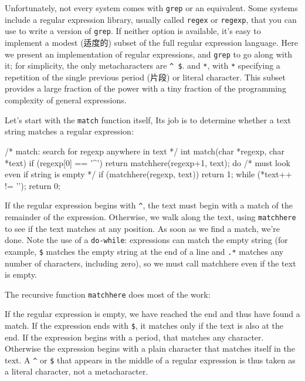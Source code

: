 Unfortunately, not every system comes with \verb'grep' or an equivalent.
Some systems include a regular expression library, usually called
\verb'regex' or \verb'regexp', that you can use to write a version of
\verb'grep'. If neither option is available, it's easy to implement a
modest (适度的) subset of the full regular expression language. Here we
present an implementation of regular expressions, and \verb'grep' to go
along with it; for simplicity, the only metacharacters are \verb'^ $'. and
\verb'*', with \verb'*' specifying a repetition of the single previous
period (片段) or literal character. This subset provides a large fraction
of the power with a tiny fraction of the programming complexity of general
expressions.

Let's start with the \verb'match' function itself, Its job is to determine
whether a text string matches a regular expression:
\begin{wellcode}
    /* match: search for regexp anywhere in text */
    int match(char *regexp, char *text)
    {
        if (regexp[0] == '^')
            return matchhere(regexp+1, text);
        do {    /* must look even if string is empty */
            if (matchhere(regexp, text))
                return 1;
        } while (*text++ != '\0');
        return 0;
    }
\end{wellcode}
If the regular expression begins with \verb'^', the text must begin with a
match of the remainder of the expression. Otherwise, we walk along the
text, using \verb'matchhere' to see if the text matches at any position. As
soon as we find a match, we're done. Note the use of a \verb'do-while':
expressions can match the empty string (for example, \verb'$' matches the
empty string at the end of a line and \verb'.*' matches any number of
characters, including zero), so we must call matchhere even if the text is
empty.

The recursive function \verb'matchhere' does most of the work:
If the regular expression is empty, we have reached the end and thus have
found a match. If the expression ends with \verb'$', it matches only if the
text is also at the end. If the expression begins with a period, that
matches any character. Otherwise the expression begins with a plain
character that matches itself in the text. A \verb'^' or \verb'$' that
appears in the middle of a regular expression is thus taken as a literal
character, not a metacharacter.

